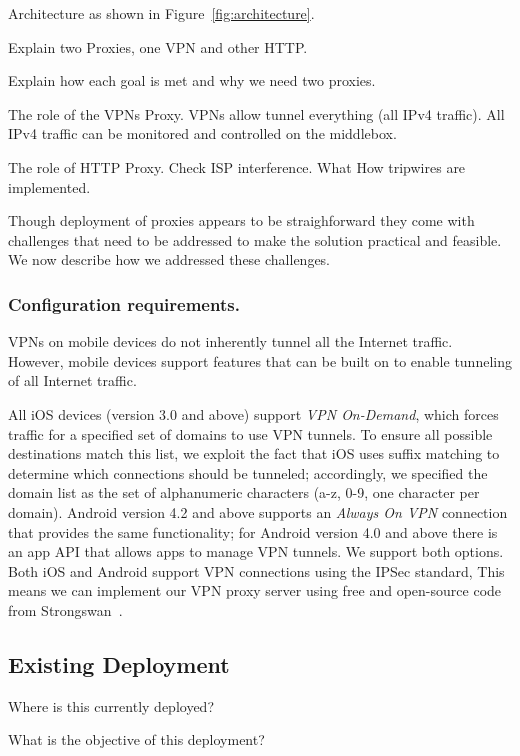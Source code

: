Architecture as shown in Figure~\ref{fig:architecture}.

Explain two Proxies, one VPN and other HTTP.

Explain how each goal is met and why we need two proxies. 

The role of the VPNs Proxy.
VPNs allow tunnel everything (all IPv4 traffic). 
All IPv4 traffic can be monitored and controlled on the middlebox. 

The role of HTTP Proxy.
Check ISP interference.
What 
How tripwires are implemented. 


Though deployment of proxies appears to be straighforward they come with challenges that need to be addressed to make the solution practical and feasible. 
We now describe how we addressed these challenges.

\subsubsection{Configuration requirements.}

VPNs on mobile devices do not inherently tunnel all the Internet traffic.
However, mobile devices support features that can be built on to enable tunneling of all Internet traffic. 

All iOS devices (version 3.0 and above) support \textit{VPN On-Demand}, which forces traffic for a specified set of domains to use VPN tunnels. 
To ensure all possible destinations match this list, we exploit the fact that iOS uses suffix matching to determine which connections should be tunneled; accordingly, we specified the domain list as the set of alphanumeric characters (a-z, 0-9, one character per domain). 
Android version 4.2 and above supports an \textit{Always On VPN} connection that provides the same functionality; for Android version 4.0 and above there is an app API that allows apps to manage VPN tunnels. 
We support both options.
Both iOS and Android support VPN connections using the IPSec standard, This means we can implement our VPN proxy server using free and open-source code from Strongswan~\cite{strongswan}. 



\subsection{Existing Deployment}

Where is this currently deployed?

What is the objective of this deployment?


